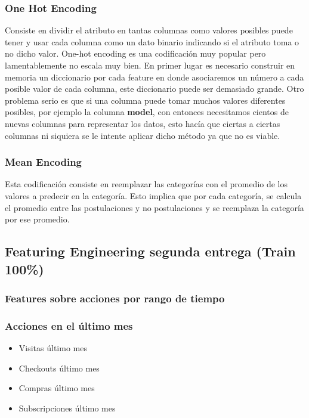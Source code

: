 \documentclass[a4paper ,12pt]{article}
\begin{document}
\subsubsection{One Hot Encoding}

Consiste en dividir el atributo en tantas columnas como valores posibles puede tener y usar cada columna como un dato binario indicando si el atributo toma o no dicho
valor. One-hot encoding es una codificación muy popular pero lamentablemente
no escala muy bien. En primer lugar es necesario construir en memoria un
diccionario por cada feature en donde asociaremos un número a cada posible
valor de cada columna, este diccionario puede ser demasiado grande. Otro
problema serio es que si una columna puede tomar muchos valores diferentes
posibles, por ejemplo la columna \textbf{model}, con  entonces necesitamos cientos de nuevas columnas para representar los datos, esto hacía que ciertas a ciertas columnas ni siquiera se le intente aplicar dicho método ya que no es viable.


\subsubsection{Mean Encoding}
Esta codificación consiste en reemplazar las categorías con el
promedio de los valores a predecir en la categoría. Esto implica que por cada categoría, se calcula el promedio entre las postulaciones y no postulaciones y se
reemplaza la categoría por ese promedio.


\subsection{Featuring Engineering segunda entrega (Train 100\%)}

\subsubsection{ Features sobre acciones por rango de tiempo }

		
		\subsubsection{Acciones en el último mes}
	
		\begin{itemize}
		 	
		\item Visitas último mes
		
		\item Checkouts último mes
		
		\item Compras último mes
		
		\item Subscripciones último mes
		\end{itemize}
		
\end{document}
